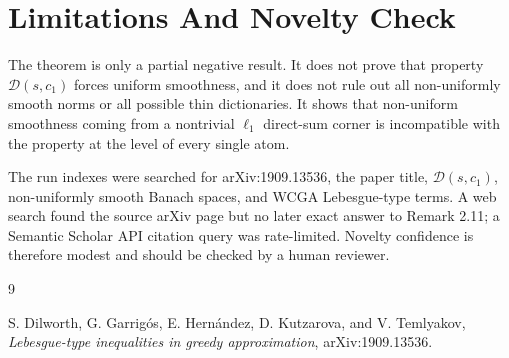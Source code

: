 \documentclass[11pt]{amsart}
\begin{document}
\section*{Limitations And Novelty Check}

The theorem is only a partial negative result. It does not prove that property
\(\mathcal D(s,c_1)\) forces uniform smoothness, and it does not rule out all
non-uniformly smooth norms or all possible thin dictionaries. It shows that
non-uniform smoothness coming from a nontrivial \(\ell_1\) direct-sum corner is
incompatible with the property at the level of every single atom.

The run indexes were searched for arXiv:1909.13536, the paper title,
\(\mathcal D(s,c_1)\), non-uniformly smooth Banach spaces, and WCGA
Lebesgue-type terms. A web search found the source arXiv page but no later
exact answer to Remark 2.11; a Semantic Scholar API citation query was
rate-limited. Novelty confidence is therefore modest and should be checked by
a human reviewer.

\begin{thebibliography}{9}

S. Dilworth, G. Garrig\'os, E. Hern\'andez, D. Kutzarova, and V. Temlyakov,
\emph{Lebesgue-type inequalities in greedy approximation},
arXiv:1909.13536.

\end{thebibliography}
\end{document}
